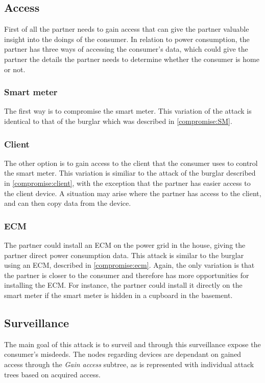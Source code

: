 \subsection{Access}
First of all the partner needs to gain access that can give the partner valuable insight into the doings of the consumer.
In relation to power consumption, the partner has three ways of accessing the consumer's data, which could give the partner the details the partner needs to determine whether the consumer is home or not.

\subsubsection{Smart meter}
The first way is to compromise the smart meter.
This variation of the attack is identical to that of the burglar which was described in \cref{compromise:SM}.

\subsubsection{Client}
The other option is to gain access to the client that the consumer uses to control the smart meter.
This variation is similiar to the attack of the burglar described in \cref{compromise:client}, with the exception that the partner has easier access to the client device.
A situation may arise where the partner has access to the client, and can then copy data from the device.

\subsubsection{ECM}
The partner could install an ECM on the power grid in the house, giving the partner direct power consumption data.
This attack is similar to the burglar using an ECM, described in \cref{compromise:ecm}.
Again, the only variation is that the partner is closer to the consumer and therefore has more opportunities for installing the ECM.
For instance, the partner could install it directly on the smart meter if the smart meter is hidden in a cupboard in the basement.

\subsection{Surveillance}
The main goal of this attack is to surveil and through this surveillance expose the consumer's misdeeds.
The nodes regarding devices are dependant on gained access through the \textit{Gain access} subtree, as is represented with individual attack trees based on acquired access.

